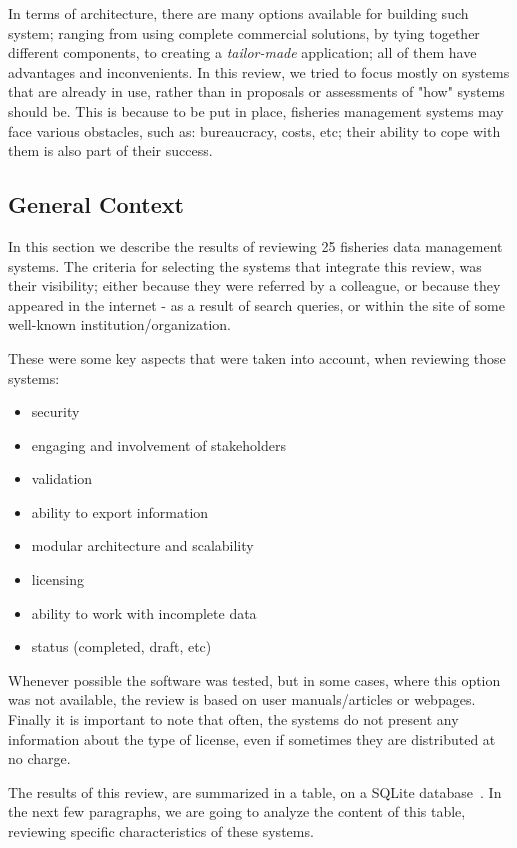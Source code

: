 \documentclass[11pt]{article} %
\begin{document}
In terms of architecture, there are many options available for building such system; ranging from using complete commercial solutions, by tying together different components, to creating a \emph{tailor-made} application; all of them have advantages and inconvenients. In this review, we tried to focus mostly on systems that are already in use, rather than in proposals or assessments of "how" systems should be. This is because to be put in place, fisheries management systems may face various obstacles, such as: bureaucracy, costs, etc; their ability to cope with them is also part of their success. 

\subsection{General Context}\label{context}
In this section we describe the results of reviewing 25 fisheries data management systems. The criteria for selecting the systems that integrate this review, was their visibility; either because they were referred by a colleague, or because they appeared in the internet - as a result of search queries, or within the site of some well-known institution/organization.

These were some key aspects that were taken into account, when reviewing those systems:
\begin{itemize}
\item security
\item engaging and involvement of stakeholders
\item validation    
\item ability to export information  
\item modular architecture and scalability   
\item licensing     
\item ability to work with incomplete data     
\item status (completed, draft, etc)     
\end{itemize}    
    
Whenever possible the software was tested, but in some cases, where this option was not available, the review is based on user manuals/articles or webpages. Finally it is important to note that often, the systems do not present any information about the type of license, even if sometimes they are distributed at no charge. 

The results of this review, are summarized in a table, on a SQLite database~\cite{bd}. In the next few paragraphs, we are going to analyze the content of this table, reviewing specific characteristics of these systems.
\end{document}
